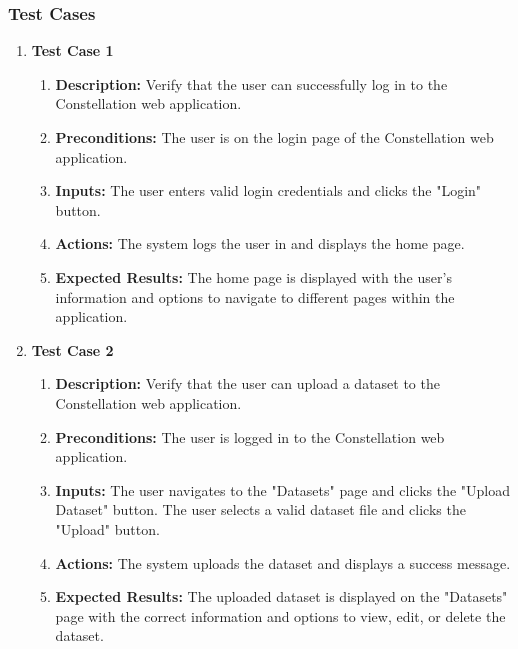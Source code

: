 \documentclass[12pt,a4paper]{report}     %
\begin{document}
\begin{normalsize}
{{{{\subsubsection{Test Cases}
\begin{enumerate}
\item\textbf{Test Case 1}
\begin{enumerate}
    \item \textbf{Description:} Verify that the user can successfully log in to the Constellation web application.
    \item \textbf{Preconditions:} The user is on the login page of the Constellation web application.
    \item \textbf{Inputs:} The user enters valid login credentials and clicks the "Login" button.
    \item \textbf{Actions:} The system logs the user in and displays the home page.
    \item \textbf{Expected Results:} The home page is displayed with the user's information and options to navigate to different pages within the application.
\end{enumerate}
\item\textbf{Test Case 2}
\begin{enumerate}
\item \textbf{Description:} Verify that the user can upload a dataset to the Constellation web application.
\item \textbf{Preconditions:} The user is logged in to the Constellation web application.
\item \textbf{Inputs:} The user navigates to the "Datasets" page and clicks the "Upload Dataset" button. The user selects a valid dataset file and clicks the "Upload" button.
\item \textbf{Actions:} The system uploads the dataset and displays a success message.
\item \textbf{Expected Results:} The uploaded dataset is displayed on the "Datasets" page with the correct information and options to view, edit, or delete the dataset.
\end{enumerate}


\end{enumerate}}}}}
\end{normalsize}
\end{document}
